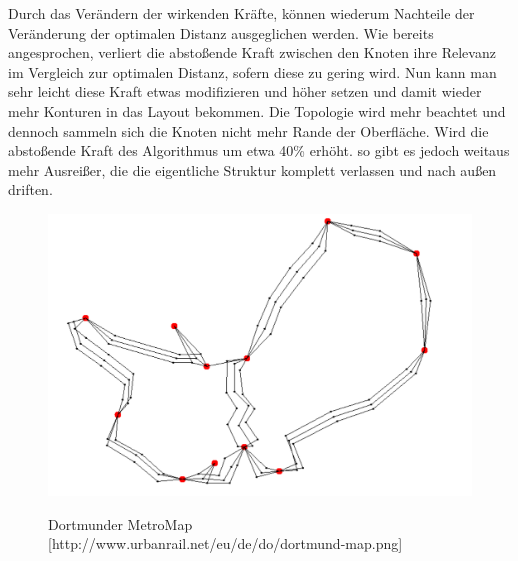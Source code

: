 Durch das Verändern der wirkenden Kräfte, können wiederum Nachteile der Veränderung der optimalen Distanz ausgeglichen werden. Wie bereits angesprochen, verliert die abstoßende Kraft zwischen den Knoten ihre Relevanz im Vergleich zur optimalen Distanz, sofern diese zu gering wird. Nun kann man sehr leicht diese Kraft etwas modifizieren und höher setzen und damit wieder mehr Konturen in das Layout bekommen. Die Topologie wird mehr beachtet und dennoch sammeln sich die Knoten nicht mehr Rande der Oberfläche. Wird die abstoßende Kraft des Algorithmus um etwa 40\% erhöht. so gibt es jedoch weitaus mehr Ausreißer, die die eigentliche Struktur komplett verlassen und nach außen driften. \\
\begin{figure}[t]
\centering
{\includegraphics[scale=0.5]{bilder/graphfertig}\label{fig_dortmundmap}
}\\
\caption[Dortmunder MetroMap]{Dortmunder MetroMap [http://www.urbanrail.net/eu/de/do/dortmund-map.png]}
\label{fig_dortmundmap}
\end{figure}
